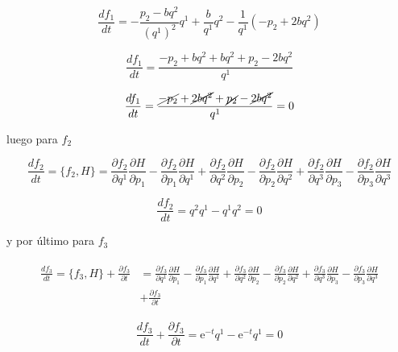 \documentclass[a4paper,10pt]{article}
\numberwithin{equation}{section}
\newcommand{\euler}{\mathrm{e}}
\begin{document}
\begin{equation}
 \frac{df_1}{dt} = - \frac{p_2 - bq^2}{(q^1)^2}q^1 + \frac{b}{q^1}q^2
 - \frac{1}{q^1}(-p_2 + 2bq^2)
\end{equation}

\begin{equation}
 \frac{df_1}{dt} = \frac{-p_2 + bq^2 + bq^2 + p_2 -2bq^2}{q^1} 
\end{equation}

\begin{equation}
 \frac{df_1}{dt} = \frac{\cancel{-p_2} + \cancel{2bq^2} + \cancel{p_2} - \cancel{2bq^2}}{q^1} = 0
\end{equation}

luego para $f_2$

\begin{equation}
 \frac{df_2}{dt} = \{f_2,H\} = \frac{\partial f_2}{\partial q^1}\frac{\partial H}{\partial p_1} - 
 \frac{\partial f_2}{\partial p_1}\frac{\partial H}{\partial q^1} +  \frac{\partial f_2}{\partial q^2}\frac{\partial H}{\partial p_2} - 
 \frac{\partial f_2}{\partial p_2}\frac{\partial H}{\partial q^2} +  \frac{\partial f_2}{\partial q^3}\frac{\partial H}{\partial p_3} - 
 \frac{\partial f_2}{\partial p_3}\frac{\partial H}{\partial q^3}
\end{equation}

\begin{equation}
 \frac{df_2}{dt} = q^2q^1 - q^1q^2 = 0
\end{equation}

y por último para $f_3$

\begin{align*}
\begin{split}
 \frac{df_3}{dt} = \{f_3,H\} + \frac{\partial f_3}{\partial t} &= \frac{\partial f_3}{\partial q^1}\frac{\partial H}{\partial p_1} - 
 \frac{\partial f_3}{\partial p_1}\frac{\partial H}{\partial q^1} +  \frac{\partial f_3}{\partial q^2}\frac{\partial H}{\partial p_2} - 
 \frac{\partial f_3}{\partial p_2}\frac{\partial H}{\partial q^2} +  \frac{\partial f_3}{\partial q^3}\frac{\partial H}{\partial p_3} - 
 \frac{\partial f_3}{\partial p_3}\frac{\partial H}{\partial q^3} \\
 &+ \frac{\partial f_3}{\partial t}
\end{split}
\end{align*}

\begin{equation}
 \frac{df_3}{dt} + \frac{\partial f_3}{\partial t} = \euler^{-t}q^1 -\euler^{-t}q^1 = 0
\end{equation}
\end{document}
